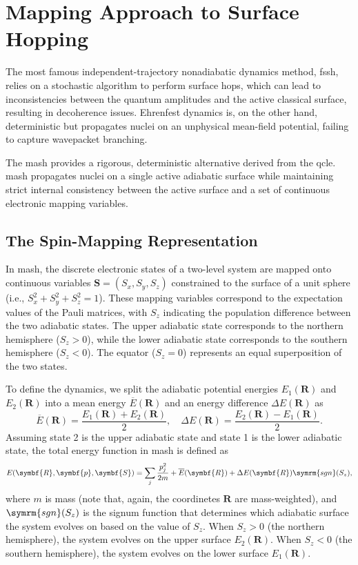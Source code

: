 \section{Mapping Approach to Surface Hopping}\label{sec:mash}
The most famous independent-trajectory nonadiabatic dynamics method, \gls{fssh}, relies on a stochastic algorithm to perform surface hops, which can lead to inconsistencies between the quantum amplitudes and the active classical surface, resulting in decoherence issues. Ehrenfest dynamics is, on the other hand, deterministic but propagates nuclei on an unphysical mean-field potential, failing to capture wavepacket branching.

The \gls{mash} provides a rigorous, deterministic alternative derived from the \gls{qcle}. \gls{mash} propagates nuclei on a single active adiabatic surface while maintaining strict internal consistency between the active surface and a set of continuous electronic mapping variables.\supercite{10.1063/5.0139734}
\subsection{The Spin-Mapping Representation}\label{sec:mash_mapping}
In \gls{mash}, the discrete electronic states of a two-level system are mapped onto continuous variables $\symbf{S}=(S_x,S_y,S_z)$ constrained to the surface of a unit sphere (i.e., $S_x^2+S_y^2+S_z^2=1$). These mapping variables correspond to the expectation values of the Pauli matrices, with $S_z$ indicating the population difference between the two adiabatic states. The upper adiabatic state corresponds to the northern hemisphere ($S_z>0$), while the lower adiabatic state corresponds to the southern hemisphere ($S_z<0$). The equator ($S_z=0$) represents an equal superposition of the two states.

To define the dynamics, we split the adiabatic potential energies $E_1(\symbf{R})$ and $E_2(\symbf{R})$ into a mean energy $\overline{E}(\symbf{R})$ and an energy difference $\Delta E(\symbf{R})$ as
\begin{equation}
\overline{E}(\symbf{R})=\frac{E_1(\symbf{R})+E_2(\symbf{R})}{2},\quad\Delta E(\symbf{R})=\frac{E_2(\symbf{R})-E_1(\symbf{R})}{2}.
\end{equation}
Assuming state 2 is the upper adiabatic state and state 1 is the lower adiabatic state, the total energy function in \gls{mash} is defined as
\begin{equation}\label{eq:mash_energy}
E(\symbf{R},\symbf{p},\symbf{S})=\sum_{j}\frac{p_j^2}{2m}+\overline{E}(\symbf{R})+\Delta E(\symbf{R})\symrm{sgn}(S_z),
\end{equation}
where $m$ is mass (note that, again, the coordinetes $\symbf{R}$ are mass-weighted), and $\symrm{sgn}(S_z)$ is the signum function that determines which adiabatic surface the system evolves on based on the value of $S_z$. When $S_z>0$ (the northern hemisphere), the system evolves on the upper surface $E_2(\symbf{R})$. When $S_z<0$ (the southern hemisphere), the system evolves on the lower surface $E_1(\symbf{R})$.

